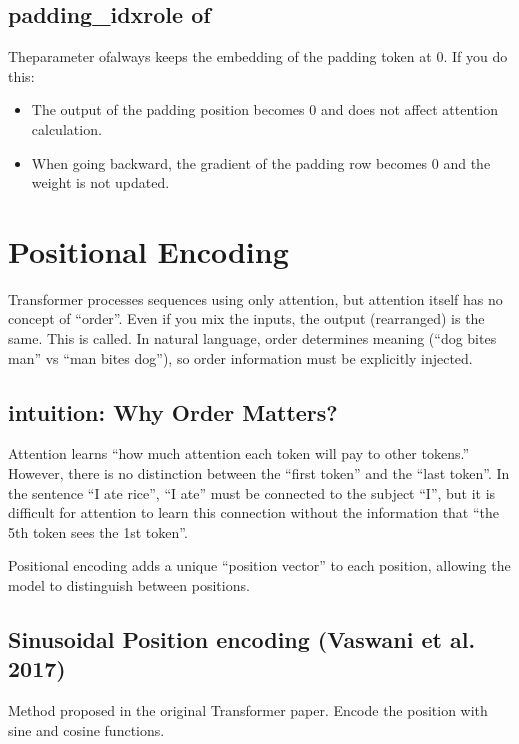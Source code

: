 \subsection{padding\_idxrole of}

Theparameter ofalways keeps the embedding of the padding token at 0. If you do this:
\begin{itemize}
\item The output of the padding position becomes 0 and does not affect attention calculation.
\item When going backward, the gradient of the padding row becomes 0 and the weight is not updated.
\end{itemize}

\section{Positional Encoding}

Transformer processes sequences using only attention, but attention itself has no concept of ``order''. Even if you mix the inputs, the output (rearranged) is the same. This is called. In natural language, order determines meaning (``dog bites man'' vs ``man bites dog''), so order information must be explicitly injected.

\subsection{intuition: Why Order Matters?}

Attention learns ``how much attention each token will pay to other tokens.'' However, there is no distinction between the ``first token'' and the ``last token''. In the sentence ``I ate rice'', ``I ate'' must be connected to the subject ``I'', but it is difficult for attention to learn this connection without the information that ``the 5th token sees the 1st token''.

Positional encoding adds a unique ``position vector'' to each position, allowing the model to distinguish between positions.

\subsection{Sinusoidal Position encoding (Vaswani et al. 2017)}

Method proposed in the original Transformer paper. Encode the position with sine and cosine functions.

